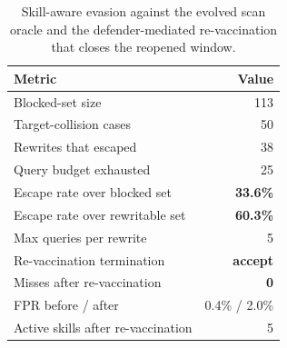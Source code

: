 \begin{table}[htbp!]
  \centering
  \footnotesize
  \setlength{\tabcolsep}{4pt}
  \renewcommand{\arraystretch}{1.22}
  \caption[Skill-aware evasion against the evolved scan oracle and the defender-mediated re-vaccination that closes the reopened window.]{%
    Skill-aware evasion against the evolved scan oracle and the
    defender-mediated re-vaccination that closes the reopened window.
  }
  \label{tab:appendix-adaptive}
  \begin{tabular*}{\columnwidth}{@{\extracolsep{\fill}}l r@{}}
    \toprule
    \textbf{Metric} & \textbf{Value} \\
    \midrule
    Blocked-set size                                 & 113 \\
    Target-collision cases                           & 50 \\
    Rewrites that escaped                            & 38 \\
    Query budget exhausted                           & 25 \\
    Escape rate over blocked set                     & \textbf{33.6\%} \\
    Escape rate over rewritable set                  & \textbf{60.3\%} \\
    Max queries per rewrite                          & 5 \\
    Re-vaccination termination                       & \textbf{accept} \\
    Misses after re-vaccination                      & \textbf{0} \\
    FPR before / after                               & 0.4\% / 2.0\% \\
    Active skills after re-vaccination               & 5 \\
    \bottomrule
  \end{tabular*}
\end{table}
